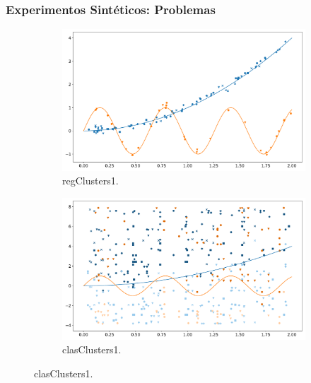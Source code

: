 \documentclass[aspectratio=43]{beamer}
\newcommand{\fdata}[1]{\textsf{#1}}
\begin{document}
\begin{frame}
      \frametitle{Experimentos Sintéticos: Problemas}

      \begin{figure}
      \begin{subfigure}[b]{0.49\textwidth}
            \centering
            \includegraphics[width=\textwidth]{Chapter6/IGPL2022/regClusters__1.pdf}
            \caption{\fdata{regClusters1}.}
      \end{subfigure}
      \hfill
      \begin{subfigure}[b]{0.49\textwidth}
            \centering
            \includegraphics[width=\textwidth]{Chapter6/IGPL2022/clasClusters__1.pdf}
            \caption{\fdata{clasClusters1}.}
      \end{subfigure}
      \end{figure}

\end{frame}
\end{document}
